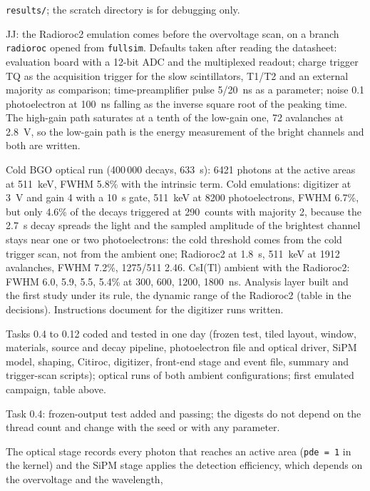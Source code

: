 \documentclass[11pt]{article}
\newcommand{\code}[1]{\texttt{#1}}
\newcommand{\us}{\textmu s\xspace}
\newcommand{\csitl}{CsI(Tl)\xspace}
\begin{document}
\begin{description}
  \code{results/}; the scratch directory is for debugging only.
\item[17 Oct 2026] JJ: the Radioroc2 emulation comes before the overvoltage
  scan, on a branch \code{radioroc} opened from \code{fullsim}. Defaults
  taken after reading the datasheet: evaluation board with a 12-bit ADC
  and the multiplexed readout; charge trigger TQ as the acquisition
  trigger for the slow scintillators, T1/T2 and an external majority as
  comparison; time-preamplifier pulse 5/20~ns as a parameter; noise 0.1
  photoelectron at 100~ns falling as the inverse square root of the
  peaking time. The high-gain path saturates at a tenth of the low-gain
  one, 72 avalanches at 2.8~V, so the low-gain path is the energy
  measurement of the bright channels and both are written.
\item[18 Oct 2026] Cold BGO optical run (400\,000 decays, 633~s): 6421
  photons at the active areas at 511~keV, FWHM 5.8\% with the intrinsic
  term. Cold emulations: digitizer at 3~V and gain 4 with a 10~\us gate,
  511~keV at 8200 photoelectrons, FWHM 6.7\%, but only 4.6\% of the decays
  triggered at 290~counts with majority 2, because the 2.7~\us decay spreads
  the light and the sampled amplitude of the brightest channel stays near
  one or two photoelectrons: the cold threshold comes from the cold trigger
  scan, not from the ambient one; Radioroc2 at 1.8~\us, 511~keV at 1912
  avalanches, FWHM 7.2\%, 1275/511 2.46. \csitl ambient with the Radioroc2:
  FWHM 6.0, 5.9, 5.5, 5.4\% at 300, 600, 1200, 1800~ns. Analysis layer
  built and the first study under its rule, the dynamic range of the
  Radioroc2 (table in the decisions). Instructions document for the
  digitizer runs written.
\item[17 Oct 2026] Tasks 0.4 to 0.12 coded and tested in one day (frozen
  test, tiled layout, window, materials, source and decay pipeline,
  photoelectron file and optical driver, SiPM model, shaping, Citiroc,
  digitizer, front-end stage and event file, summary and trigger-scan
  scripts); optical runs of both ambient configurations; first emulated
  campaign, table above.
\item[17 Oct 2026] Task 0.4: frozen-output test added and passing; the
  digests do not depend on the thread count and change with the seed or
  with any parameter.
\item[17 Oct 2026] The optical stage records every photon that reaches an
  active area (\code{pde = 1} in the kernel) and the SiPM stage applies the
  detection efficiency, which depends on the overvoltage and the wavelength,

\end{description}
\end{document}
